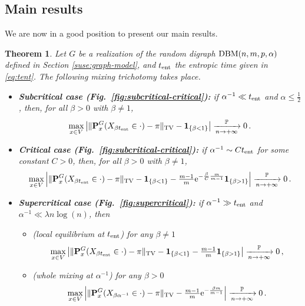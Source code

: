 \documentclass[11pt,oneside]{amsart}
\numberwithin{equation}{section}  %
\theoremstyle{plain}
\newtheorem{theorem}{Theorem}
\newcommand{\p}{\mathbb{P}}
\newcommand{\one}{\textup{\textbf{1}}}
\newcommand{\pconv}{\xrightarrow[n \to +\infty]{\quad \p \quad}}
\newcommand{\tent}{t_{\textup{ent}}}
\newcommand{\quench}{\mathbf{P}}
\begin{document}
\subsection{Main results}\label{suse:results}
 We are now in a good position to present our main results. 

\begin{theorem}\label{thm:main}
    Let $G$ be a realization of the random digraph ${\rm DBM}(n,m,p,\alpha)$ defined in Section \ref{suse:graph-model}, and $\tent$ the entropic time given in \eqref{eq:tent}. 
    The following mixing trichotomy takes place.
	\begin{itemize}
		\item \textbf{Subcritical case (Fig.~\ref{fig:subcritical-critical}):} if $\alpha^{-1}\ll \tent$ and $\alpha \le \frac12$, then, for all $\beta> 0$ with $\beta\neq 1$,
		\begin{equation}\label{eq:sub-cutoff}
			\max_{x \in V}
			\big|\|\quench^{G}_x(X_{\beta \tent}\in \cdot)-\pi\|_{\rm TV}-\one_{\{\beta<1\}}\big|
			\pconv0\,.
		\end{equation}
		\item\textbf{Critical case (Fig.~\ref{fig:subcritical-critical}):} if $\alpha^{-1}\sim C \tent$ for some constant $C>0$, then, for all $\beta>0$ with $\beta\neq 1$,
		\begin{equation}\label{eq:crit-cutoffmeta}
			\max_{x \in V}
			\left|\|\quench^{G}_x(X_{\beta \tent}\in \cdot)-\pi\|_{\rm TV}- \one_{\{\beta < 1
				\}} -
			\tfrac{m-1}{m}{\rm e}^{-\frac{\beta}{C}\frac{m}{m-1}} \one_{\{ \beta> 1 \}} \right|
			\pconv0\,.
		\end{equation}
		\item\textbf{Supercritical case (Fig.~\ref{fig:supercritical}):} if $\alpha^{-1}\gg \tent$ and $\alpha^{-1}\ll \lambda n\log(n)$, then
		\begin{itemize}
			\item (local equilibrium at $\tent$) for any $\beta\neq 1$
			\begin{equation}\label{eq:sup-cutoff}
				\max_{x \in V}
				\left|\|\quench^{G}_x(X_{\beta \tent}\in \cdot)-\pi\|_{\rm TV}- \one_{\{\beta < 1
					\}} -
				\tfrac{m-1}{m} \one_{\{ \beta> 1\}} \right|
				\pconv0\,,
			\end{equation}
			\item (whole mixing at $\alpha^{-1}$) for any $\beta>0$
			\begin{equation}\label{eq:sup-meta}
				\max_{x \in V}
				\left|\|\quench^{G}_x(X_{\beta \alpha^{-1}}\in \cdot)-\pi\|_{\rm TV}- \tfrac{m-1}{m}{\rm e}^{-\frac{\beta m}{m-1}} \right|
				\pconv0\,.
			\end{equation}
		\end{itemize}
	\end{itemize}
\end{theorem}
\end{document}
